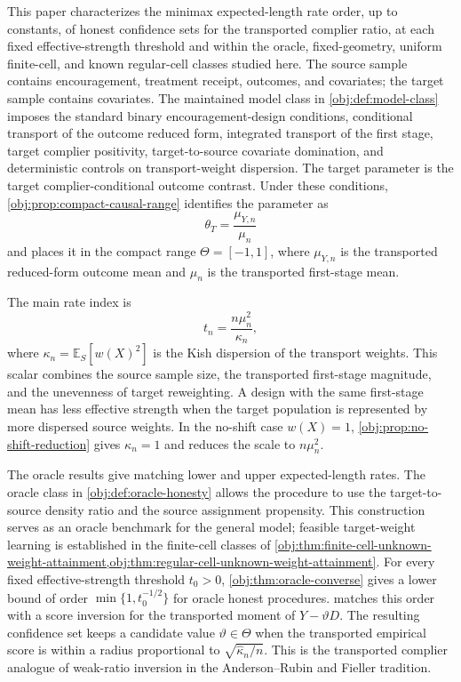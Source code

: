 \documentclass[11pt]{article}
\begin{document}
This paper characterizes the minimax expected-length rate order, up to constants, of honest confidence sets for the transported complier ratio, at each fixed effective-strength threshold and within the oracle, fixed-geometry, uniform finite-cell, and known regular-cell classes studied here. The source sample contains encouragement, treatment receipt, outcomes, and covariates; the target sample contains covariates. The maintained model class in \cref{obj:def:model-class} imposes the standard binary encouragement-design conditions, conditional transport of the outcome reduced form, integrated transport of the first stage, target complier positivity, target-to-source covariate domination, and deterministic controls on transport-weight dispersion. The target parameter is the target complier-conditional outcome contrast. Under these conditions, \cref{obj:prop:compact-causal-range} identifies the parameter as
\[
\theta_T=\frac{\mu_{Y,n}}{\mu_n}
\]
and places it in the compact range \(\Theta=[-1,1]\), where \(\mu_{Y,n}\) is the transported reduced-form outcome mean and \(\mu_n\) is the transported first-stage mean.

The main rate index is
\[
t_n=\frac{n\mu_n^2}{\kappa_n},
\]
where \(\kappa_n=\mathbb E_S[w(X)^2]\) is the Kish dispersion of the transport weights. This scalar combines the source sample size, the transported first-stage magnitude, and the unevenness of target reweighting. A design with the same first-stage mean has less effective strength when the target population is represented by more dispersed source weights. In the no-shift case \(w(X)=1\), \cref{obj:prop:no-shift-reduction} gives \(\kappa_n=1\) and reduces the scale to \(n\mu_n^2\).

The oracle results give matching lower and upper expected-length rates. The oracle class in \cref{obj:def:oracle-honesty} allows the procedure to use the target-to-source density ratio and the source assignment propensity. This construction serves as an oracle benchmark for the general model; feasible target-weight learning is established in the finite-cell classes of \cref{obj:thm:finite-cell-unknown-weight-attainment,obj:thm:regular-cell-unknown-weight-attainment}. For every fixed effective-strength threshold \(t_0>0\), \cref{obj:thm:oracle-converse} gives a lower bound of order \(\min\{1,t_0^{-1/2}\}\) for oracle honest procedures.  matches this order with a score inversion for the transported moment of \(Y-\vartheta D\). The resulting confidence set keeps a candidate value \(\vartheta\in\Theta\) when the transported empirical score is within a radius proportional to \(\sqrt{\widehat\kappa_n/n}\). This is the transported complier analogue of weak-ratio inversion in the Anderson--Rubin and Fieller tradition.
\end{document}
